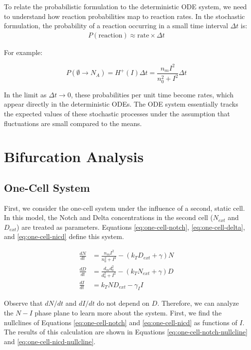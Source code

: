 \documentclass{article}
\begin{document}
\begin{flushleft}
To relate the probabilistic formulation to the deterministic ODE system, we need to understand how reaction probabilities map to reaction rates. In the stochastic formulation, the probability of a reaction occurring in a small time interval $\Delta t$ is:
\begin{align*}
P(\text{reaction}) \approx \text{rate} \times \Delta t
\end{align*}

For example:

\[
P(\emptyset \rightarrow N_A) = H^+(I) \Delta t = \frac{n_m I^2}{n_0^2 + I^2} \Delta t 
\]

In the limit as $\Delta t \rightarrow 0$, these probabilities per unit time become rates, which appear directly in the deterministic ODEs. The ODE system essentially tracks the expected values of these stochastic processes under the assumption that fluctuations are small compared to the means.

\section{Bifurcation Analysis}
\label{sec:bifurcation}

\subsection*{One-Cell System}

First, we consider the one-cell system under the influence of a second, static cell. In this model, the Notch and Delta concentrations in the second cell ($N_{ext}$ and $D_{ext}$) are treated as parameters. Equations \ref{eq:one-cell-notch}, \ref{eq:one-cell-delta}, and \ref{eq:one-cell-nicd} define this system.

\begin{align}
  \label{eq:one-cell-notch}
  \frac{dN}{dt} &= \frac{n_{m}I^2}{n_{0}^2 + I^2} - (k_{T}D_{ext} + \gamma)N \\[5pt]
  \label{eq:one-cell-delta}
  \frac{dD}{dt} &= \frac{d_{m}d_{0}^2}{d_{0}^2 + I^2} - (k_{T}N_{ext} + \gamma)D \\[5pt]
  \label{eq:one-cell-nicd}
  \frac{dI}{dt} &= k_{T}ND_{ext} - \gamma_{I}I
\end{align}

Observe that $dN/dt$ and $dI/dt$ do not depend on $D$. Therefore, we can analyze the $N-I$ phase plane to learn more about the system. First, we find the nullclines of Equations \ref{eq:one-cell-notch} and \ref{eq:one-cell-nicd} as functions of $I$. The results of this calculation are shown in Equations \ref{eq:one-cell-notch-nullcline} and \ref{eq:one-cell-nicd-nullcline}.


\end{flushleft}
\end{document}
